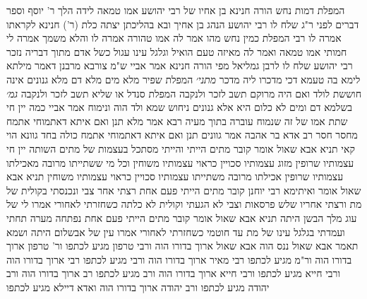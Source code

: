 \documentclass[12pt, openany]{book}
\begin{document}
{המפלת דמות נחש הורה חנינא בן אחיו של רבי יהושע אמו טמאה לידה הלך ר' יוסף וספר דברים לפני ר"ג שלח לו רבי יהושע הנהג בן אחיך ובא 
בהליכתן יצתה כלת (ר') חנינא לקראתו אמרה לו רבי המפלת כמין נחש מהו אמר לה אמו טהורה אמרה לו והלא משמך אמרה לי חמותי אמו טמאה ואמר לה מאיזה טעם הואיל וגלגל עינו עגול כשל אדם מתוך דבריה נזכר רבי יהושע שלח לו לרבן גמליאל מפי הורה חנינא 
אמר אביי ש"מ צורבא מרבנן דאמר מילתא לימא בה טעמא דכי מדכרו ליה מדכר
{\large\emph{מתני׳}} המפלת שפיר מלא מים מלא דם מלא גנונים אינה חוששת לולד ואם היה מרוקם תשב לזכר ולנקבה המפלת סנדל או שליא תשב לזכר ולנקבה
{\large\emph{גמ׳}} בשלמא דם ומים לא כלום היא אלא גנונים ניחוש שמא ולד הוה ונימוח אמר אביי כמה יין חי שתת אמו של זה שנמוח עוברה בתוך מעיה 
רבא אמר מלא תנן ואם איתא דאתמוחי אתמח מחסר חסר רב אדא בר אהבה אמר גוונים תנן ואם איתא דאתמוחי אתמח כולה בחד גוונא הוי קאי 
תניא אבא שאול אומר קובר מתים הייתי והייתי מסתכל בעצמות של מתים השותה יין חי עצמותיו שרופין מזוג עצמותיו סכויין כראוי עצמותיו משוחין וכל מי ששתייתו מרובה מאכילתו עצמותיו שרופין אכילתו מרובה משתייתו עצמותיו סכויין כראוי עצמותיו משוחין 
תניא אבא שאול אומר ואיתימא רבי יוחנן קובר מתים הייתי פעם אחת רצתי אחר צבי ונכנסתי בקולית של מת ורצתי אחריו שלש פרסאות וצבי לא הגעתי וקולית לא כלתה כשחזרתי לאחורי אמרו לי של עוג מלך הבשן היתה 
תניא אבא שאול אומר קובר מתים הייתי פעם אחת נפתחה מערה תחתי ועמדתי בגלגל עינו של מת עד חוטמי כשחזרתי לאחורי אמרו עין של אבשלום היתה 
ושמא תאמר אבא שאול ננס הוה אבא שאול ארוך בדורו הוה ורבי טרפון מגיע לכתפו ור' טרפון ארוך בדורו הוה ור"מ מגיע לכתפו רבי מאיר ארוך בדורו הוה ורבי מגיע לכתפו רבי ארוך בדורו הוה
ורבי חייא מגיע לכתפו ורבי חייא ארוך בדורו הוה ורב מגיע לכתפו רב ארוך בדורו הוה ורב יהודה מגיע לכתפו ורב יהודה ארוך בדורו הוה ואדא דיילא מגיע לכתפו}
\end{document}
